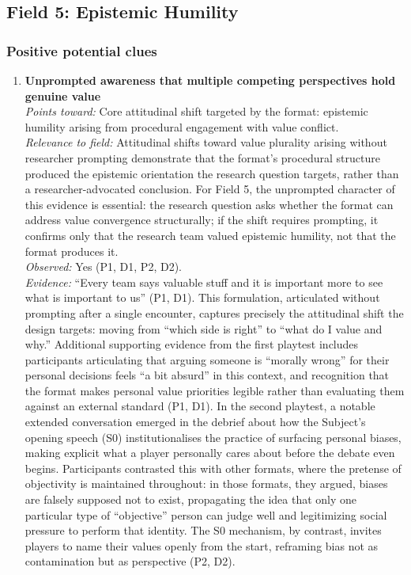 \documentclass[12pt]{article}
\begin{document}
\subsection*{Field 5: Epistemic Humility}

\subsubsection*{Positive potential clues}

\begin{enumerate}

\item \textbf{Unprompted awareness that multiple competing perspectives hold genuine value}\\
\textit{Points toward:} Core attitudinal shift targeted by the format: epistemic humility arising from procedural engagement with value conflict.\\
\textit{Relevance to field:} Attitudinal shifts toward value plurality arising without researcher prompting demonstrate that the format's procedural structure produced the epistemic orientation the research question targets, rather than a researcher-advocated conclusion. For Field 5, the unprompted character of this evidence is essential: the research question asks whether the format can address value convergence structurally; if the shift requires prompting, it confirms only that the research team valued epistemic humility, not that the format produces it.\\
\textit{Observed:} Yes (P1, D1, P2, D2).\\
\textit{Evidence:} ``Every team says valuable stuff and it is important more to see what is important to us'' (P1, D1). This formulation, articulated without prompting after a single encounter, captures precisely the attitudinal shift the design targets: moving from ``which side is right'' to ``what do I value and why.'' Additional supporting evidence from the first playtest includes participants articulating that arguing someone is ``morally wrong'' for their personal decisions feels ``a bit absurd'' in this context, and recognition that the format makes personal value priorities legible rather than evaluating them against an external standard (P1, D1). In the second playtest, a notable extended conversation emerged in the debrief about how the Subject's opening speech (S0) institutionalises the practice of surfacing personal biases, making explicit what a player personally cares about before the debate even begins. Participants contrasted this with other formats, where the pretense of objectivity is maintained throughout: in those formats, they argued, biases are falsely supposed not to exist, propagating the idea that only one particular type of ``objective'' person can judge well and legitimizing social pressure to perform that identity. The S0 mechanism, by contrast, invites players to name their values openly from the start, reframing bias not as contamination but as perspective (P2, D2).\\

\end{enumerate}
\end{document}
